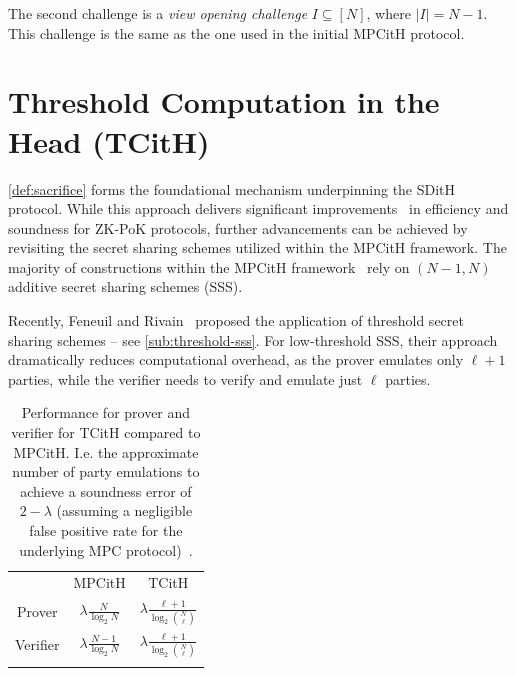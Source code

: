 \documentclass[11pt]{report}
\theoremstyle{definition}
\theoremstyle{plain}
\begin{document}
The second challenge is a \textit{view opening challenge} $I \subseteq [N]$, where $|I| = N-1$. This challenge is the same as the one used in the initial MPCitH protocol.

\section{Threshold Computation in the Head (TCitH)}\label{sec:threshold-mpc}

\autoref{def:sacrifice} forms the foundational mechanism underpinning the SDitH protocol. While this approach delivers significant improvements~\cite{baum2020concretely,feneuil2022syndrome} in efficiency and soundness for ZK-PoK protocols, further advancements can be achieved by revisiting the secret sharing schemes utilized within the MPCitH framework. The majority of constructions within the MPCitH framework~\cite{baum2020concretely,feneuil2022syndrome,katz2018improved} rely on $(N-1, N)$ additive secret sharing schemes (SSS). 

Recently, Feneuil and Rivain~\cite{feneuil2023threshold,feneuil2023threshold2} proposed the application of threshold secret sharing schemes -- see \autoref{sub:threshold-sss}. For low-threshold SSS, their approach dramatically reduces computational overhead, as the prover emulates only $\ell + 1$ parties, while the verifier needs to verify and emulate just $\ell$ parties.

\begin{table}[]
  \centering
  \def\arraystretch{1.5}%
  \begin{tabular}{ccc}
    \textbf{} & MPCitH                                  & TCitH                                                      \\ \arrayrulecolor{darkgray}\hline
    Prover    & $ \lambda \frac{N}{\log_2 N}$   & $ \lambda \frac{\ell + 1}{\log_2 \binom{N}{\ell}}$ \\ \arrayrulecolor{lightgray}\hline
    Verifier  & $ \lambda \frac{N-1}{\log_2 N}$ & $ \lambda \frac{\ell + 1}{\log_2 \binom{N}{\ell}}$ \\ \arrayrulecolor{darkgray}\hline
  \end{tabular}
  \caption{Performance for prover and verifier for TCitH compared to MPCitH. I.e. the approximate number of party emulations to achieve a soundness error of $2-\lambda$ (assuming a negligible false positive rate for the underlying MPC protocol)~\cite{feneuil2023threshold}.}\label{tbl:tcith-performance}
\end{table}
\end{document}
